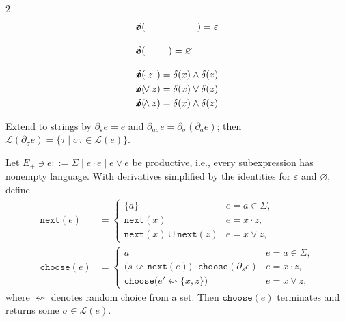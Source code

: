 \documentclass[popl.tex]{subfiles}
\begin{document}
\begin{definition}
\begin{multicols}{2}
\begin{eqnarray*}
      \delta(&\hspace{-0.35cm} \varepsilon \hspace{-0.35cm}&) = \varepsilon                                      \\
      \delta(&\hspace{-0.35cm} a           \hspace{-0.35cm}&) = \varnothing\phantom{\begin{cases}\varepsilon\\\varnothing\end{cases}}\\
      \delta(&\hspace{-0.35cm} x\cdot z    \hspace{-0.35cm}&) = \delta(x) \land \delta(z)                        \\
      \delta(&\hspace{-0.35cm} x\vee  z    \hspace{-0.35cm}&) = \delta(x) \vee  \delta(z)                        \\
      \delta(&\hspace{-0.35cm} x\land z    \hspace{-0.35cm}&) = \delta(x) \land \delta(z)
    \end{eqnarray*}
  \end{multicols}
  \noindent Extend to strings by \(\partial_\varepsilon e=e\) and \(\partial_{a\sigma}e=\partial_\sigma(\partial_a e)\); then \(\mathcal{L}(\partial_\sigma e)=\{\tau\mid\sigma\tau\in \mathcal{L}(e)\}\).
\end{definition}

\begin{lemma}\label{lem:generation}
  Let \(E_+ \ni e ::= \Sigma \mid e\cdot e\mid e\vee e\) be productive, i.e., every subexpression has nonempty language.  With derivatives simplified by the identities for \(\varepsilon\) and \(\varnothing\), define
  \[
    \begin{aligned}
      \texttt{next}(e)&=\begin{cases}
        \{a\} & e=a\in\Sigma,\\
        \texttt{next}(x) & e=x\cdot z,\\
        \texttt{next}(x)\cup\texttt{next}(z) & e=x\vee z,
      \end{cases}\\[-.25ex]
      \texttt{choose}(e)&=\begin{cases}
        a & e=a\in\Sigma,\\
        \big(s\leftsquigarrow\texttt{next}(e)\big)\cdot\texttt{choose}(\partial_s e)
        & e=x\cdot z,\\
        \texttt{choose}\big(e'\leftsquigarrow\{x,z\}\big) & e=x\vee z,
      \end{cases}
    \end{aligned}
  \]
  where $\leftsquigarrow$ denotes random choice from a set. Then \(\texttt{choose}(e)\) terminates and returns some \(\sigma\in\mathcal{L}(e)\).
\end{lemma}
\end{document}
